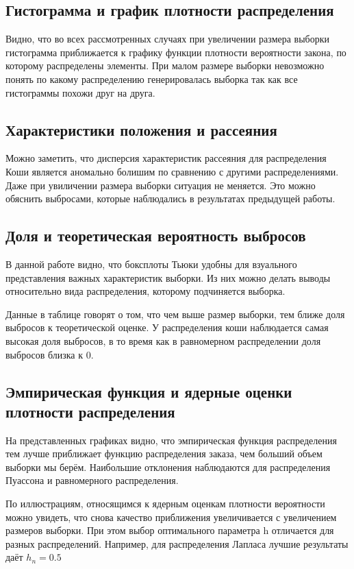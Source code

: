 \documentclass[a4paper]{article}
\begin{document}
    \subsection{Гистограмма и график плотности распределения}
        Видно, что во всех рассмотренных случаях при увеличении размера выборки гистограмма приближается к графику функции плотности вероятности закона, по которому распределены элементы.
        При малом размере выборки невозможно понять по какому распределению генерировалась выборка так как все гистограммы похожи друг на друга.
    \subsection{Характеристики положения и рассеяния}
        Можно заметить, что дисперсия характеристик рассеяния для распределения Коши является аномально болишим по сравнению с другими распределениями.
        Даже при увиличении размера выборки ситуация не меняется. Это можно обяснить выбросами, которые наблюдались в результатах предыдущей работы.
    \subsection{Доля и теоретическая вероятность выбросов}
        В данной работе видно, что боксплоты Тьюки удобны для взуального представления важных
        характеристик выборки. Из них можно делать выводы относительно
        вида распределения, которому подчиняется выборка.

        Данные в таблице говорят о том, что чем выше размер выборки, тем ближе доля выбросов к теоретической оценке. У распределения коши наблюдается самая высокая доля выбросов, в то время как в равномерном распределении доля выбросов близка к 0.

    \subsection{Эмпирическая функция и ядерные оценки плотности распределения}
        На представленных графиках видно, что эмпирическая функция распределения тем лучше приближает функцию распределения заказа, чем больший объем выборки мы берём. Наибольшие отклонения наблюдаются для распределения Пуассона и равномерного распределения.


        По иллюстрациям, относящимся к ядерным оценкам плотности вероятности можно увидеть, что снова качество приближения увеличивается с увеличением размеров выборки. При этом выбор оптимального параметра h отличается для разных распределений. Например, для распределения Лапласа лучшие результаты даёт $h_n=0.5$
\end{document}
